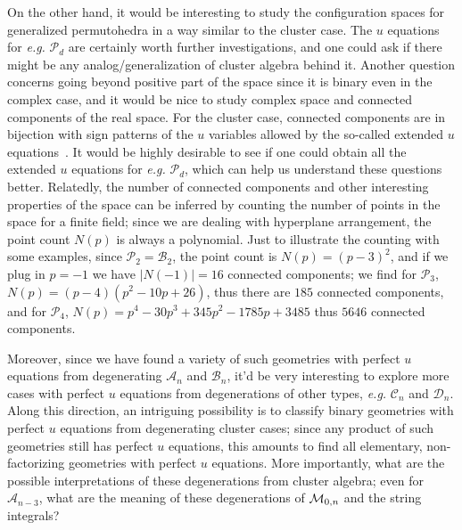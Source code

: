 \documentclass[hidelinks,12pt]{article}
\begin{document}
On the other hand, it would be interesting to study the configuration spaces for generalized permutohedra in a way similar to the cluster case. The $u$ equations for {\it e.g.} ${\mathscr P}_d$ are certainly worth further investigations, and one could ask if there might be any analog/generalization of cluster algebra behind it. Another question concerns going beyond positive part of the space since it is binary even in the complex case, and it would be nice to study complex space and connected components of the real space. For the cluster case, connected components are in bijection with sign patterns of the $u$ variables allowed by the so-called extended $u$ equations~\cite{Arkani-Hamed:2019plo}. It would be highly desirable to see if one could obtain all the extended $u$ equations for {\it e.g.} ${\mathscr P}_d$, which can help us understand these questions better. Relatedly, the number of connected components and other interesting properties of the space can be inferred by counting the number of points in the space for a finite field; since we are dealing with hyperplane arrangement, the point count $N(p)$ is always a polynomial. Just to illustrate the counting with some examples, since ${\mathscr P}_2={\mathscr B}_2$, the point count is $N(p)=(p-3)^2$, and if we plug in $p=-1$ we have $|N(-1)|=16$ connected components; we find for ${\mathscr P}_3$, $N(p)=(p-4)(p^2-10p+26)$, thus there are $185$ connected components, and for ${\mathscr P}_4$, $N(p)=p^4- 30 p^3+ 345 p^2- 1785 p+3485$ thus $5646$ connected components. 

Moreover, since we have found a variety of such geometries with perfect $u$ equations from degenerating ${\mathscr A}_n$ and ${\mathscr B}_n$, it'd be very interesting to explore more cases with perfect $u$ equations from degenerations of other types, {\it e.g.} ${\mathscr C_n}$ and ${\mathscr D_n}$. Along this direction, an intriguing possibility is to classify binary geometries with perfect $u$ equations from degenerating cluster cases; since any product of such geometries still has perfect $u$ equations, this amounts to find all elementary, non-factorizing geometries with perfect $u$ equations. More importantly,  what are the possible interpretations of these degenerations from cluster algebra; even for ${\mathscr A}_{n-3}$, what are the meaning of these degenerations of ${\cal M}_{0,n}$ and the string integrals?
\end{document}
